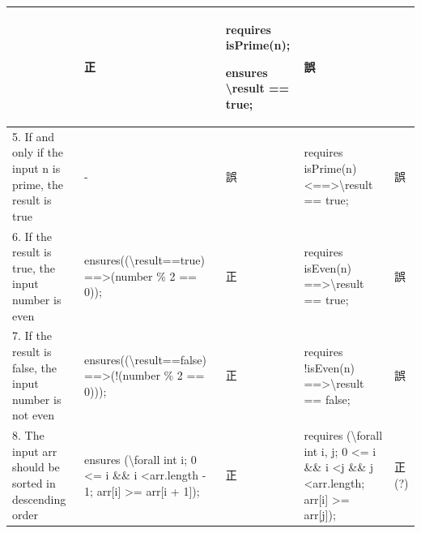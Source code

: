 \documentclass[uplatex, twocolumn,10pt]{jsarticle} %
\begin{document}
\begin{table}[t]
\begin{tabular}{p{25mm}|p{45mm}|p{7mm}|p{45mm}|p{7mm}}
                                                                                                           & 正                                                                                                                                                                                                              & requires isPrime(n); \par ensures \textbackslash result == true;      & 誤                                                                                                                                             \\ \hline
        5. If and only if the input n is prime, the result is true                                         & -                                                                                                                                                                                                               & 誤                                                                    & requires isPrime(n) \textless==\textgreater \textbackslash result == true;                                                             & 誤    \\ \hline
        6. If the result is true, the input number is even                                                 & ensures((\textbackslash result==true) ==\textgreater (number \% 2 == 0));                                                                                                                                       & 正                                                                    & requires isEven(n) ==\textgreater \textbackslash result == true;                                                                       & 誤    \\ \hline
        7. If the result is false, the input number is not even                                            & ensures((\textbackslash result==false) ==\textgreater (!(number \% 2 == 0)));                                                                                                                                   & 正                                                                    & requires !isEven(n) ==\textgreater \textbackslash result == false;                                                                     & 誤    \\ \hline
        8. The input arr should be sorted in descending order                                              & ensures (\textbackslash forall int i; 0 \textless= i \&\& i \textless arr.length - 1; arr[i] \textgreater= arr[i + 1]);                                                                                         & 正                                                                    & requires (\textbackslash forall int i, j; 0 \textless= i \&\& i \textless j \&\& j \textless arr.length; arr[i] \textgreater= arr[j]); & 正(?) \\ \hline

\end{tabular}
\end{table}
\end{document}
